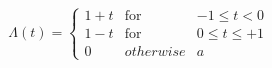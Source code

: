 \documentclass[preview]{standalone}
\begin{document}
\begin{align*}
\Lambda(t)=\left\{\begin{array}{rcl}1+t & \textrm{for} & -1\leq t<0 \\ 1-t & \textrm{for} & 0\leq t \leq +1 \\ 0 & otherwise & a \end{array}\right.
\end{align*}
\end{document}
